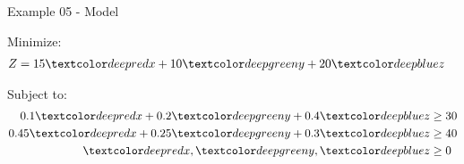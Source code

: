 \begin{frame}{Example 05 - Model}

Minimize:
\begin{align*}
    Z &= 15\colora{x} + 10\colorb{y} + 20\colorc{z}
\end{align*}

Subject to:
\begin{align*}
    0.1 \colora{x} + 0.2 \colorb{y} + 0.4\colorc{z} &\ge 30 \\
    0.45\colora{x} + 0.25\colorb{y} + 0.3\colorc{z} &\ge 40 \\
        \colora{x}, \colorb{y}, \colorc{z} &\ge 0
\end{align*}

\end{frame}
